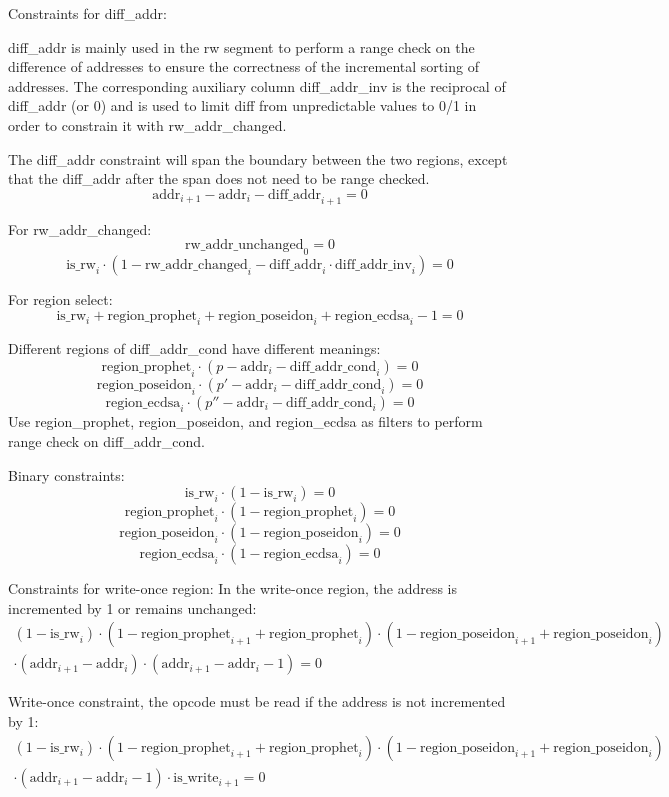 Constraints for diff\_addr:

diff\_addr is mainly used in the rw segment to perform a range check on the difference of addresses to ensure the correctness of the incremental sorting of addresses. The corresponding auxiliary
column diff\_addr\_inv is the reciprocal of diff\_addr (or 0) and is used to limit diff from unpredictable values to 0/1 in order to constrain it with rw\_addr\_changed.

The diff\_addr constraint will span the boundary between the two regions, except that the diff\_addr after the span does not need to be range checked.
\[ \mathrm{addr}_{i+1} - \mathrm{addr}_i - \mathrm{diff\_addr}_{i+1} = 0 \]

For rw\_addr\_changed:
\[ \mathrm{rw\_addr\_unchanged}_0 = 0 \]
\[ \mathrm{is\_rw}_i \cdot (1 - \mathrm{rw\_addr\_changed}_i - \mathrm{diff\_addr}_i \cdot \mathrm{diff\_addr\_inv}_i) = 0 \]

For region select:
\[ \mathrm{is\_rw}_i + \mathrm{region\_prophet}_i + \mathrm{region\_poseidon}_i + \mathrm{region\_ecdsa}_i - 1 = 0 \]

Different regions of diff\_addr\_cond have different meanings:
\[ \mathrm{region\_prophet}_i \cdot (p - \mathrm{addr}_i - \mathrm{diff\_addr\_cond}_i) = 0 \]
\[ \mathrm{region\_poseidon}_i \cdot (p'- \mathrm{addr}_i - \mathrm{diff\_addr\_cond}_i) = 0 \]
\[ \mathrm{region\_ecdsa}_i \cdot (p'' - \mathrm{addr}_i - \mathrm{diff\_addr\_cond}_i) = 0 \]
Use region\_prophet, region\_poseidon, and region\_ecdsa as filters to perform range check on diff\_addr\_cond.

Binary constraints:
\[ \mathrm{is\_rw}_i \cdot (1 - \mathrm{is\_rw}_i) = 0 \]
\[ \mathrm{region\_prophet}_i \cdot (1 - \mathrm{region\_prophet}_i) = 0 \]
\[ \mathrm{region\_poseidon}_i \cdot (1 - \mathrm{region\_poseidon}_i)=0 \]
\[ \mathrm{region\_ecdsa}_i \cdot (1 - \mathrm{region\_ecdsa}_i)= 0 \]

Constraints for write-once region:
In the write-once region, the address is incremented by 1 or remains unchanged:
\begin{multline*}
    (1-\mathrm{is\_rw}_i) \cdot (1-\mathrm{region\_prophet}_{i+1}+\mathrm{region\_prophet}_i) \cdot (1-\mathrm{region\_poseidon}_{i+1}+\mathrm{region\_poseidon}_i) \\
    \cdot (\mathrm{addr}_{i+1}-\mathrm{addr}_i) \cdot (\mathrm{addr}_{i+1}-\mathrm{addr}_i-1)=0
\end{multline*}

Write-once constraint, the opcode must be read if the address is not incremented by 1:
\begin{multline*}
    (1-\mathrm{is\_rw}_i) \cdot (1-\mathrm{region\_prophet}_{i+1}+\mathrm{region\_prophet}_i) \cdot (1-\mathrm{region\_poseidon}_{i+1}+\mathrm{region\_poseidon}_i) \\
    \cdot (\mathrm{addr}_{i+1}-\mathrm{addr}_i-1) \cdot \mathrm{is\_write}_{i+1}=0
\end{multline*}

